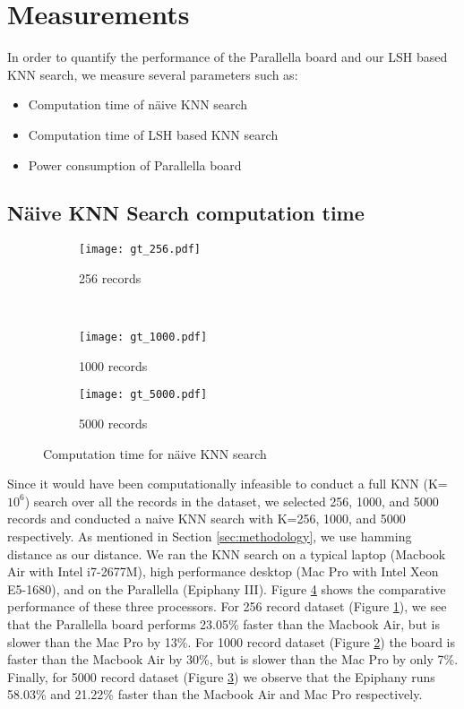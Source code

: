 \section{Measurements}
\label{sec:measurements}
In order to quantify the performance of the Parallella board and our LSH based KNN search, we measure several parameters such as:
\begin{itemize}
\item Computation time of n\"{a}ive KNN search
\item Computation time of LSH based KNN search
\item Power consumption of Parallella board
\end{itemize}
\subsection{N\"{a}ive KNN Search computation time}
\label{subsec:nknn_comptime}
\begin{figure}
\centering
\begin{subfigure}[b]{0.3\textwidth}
	\texttt{[image: gt\_256.pdf]}
	\caption{256 records}
	\label{fig:k256_comptime}
\end{subfigure}
~
\begin{subfigure}[b]{0.3\textwidth}
	\texttt{[image: gt\_1000.pdf]}
	\caption{1000 records}
	\label{fig:k1000_comptime}
\end{subfigure}
\begin{subfigure}[b]{0.3\textwidth}
	\texttt{[image: gt\_5000.pdf]}
	\caption{5000 records}
	\label{fig:k5000_comptime}
\end{subfigure}
\caption{Computation time for n\"{a}ive KNN search}
\label{fig:fullK256_1000_5000}
\end{figure}
Since it would have been computationally infeasible to conduct a full KNN (K=$10^6$) search over all the records in the dataset, we selected 256, 1000, and 5000 records and conducted a naive KNN search with K=256, 1000, and 5000 respectively. 
As mentioned in Section \ref{sec:methodology}, we use hamming distance as our distance. 
We ran the KNN search on a typical laptop (Macbook Air with Intel i7-2677M), high performance desktop (Mac Pro with Intel Xeon E5-1680), and on the Parallella (Epiphany III). 
Figure \ref{fig:fullK256_1000_5000} shows the comparative performance of these three processors. For 256 record dataset (Figure \ref{fig:k256_comptime}), we see that the Parallella board performs 23.05\% faster than the Macbook Air, but is slower than the Mac Pro by 13\%. 
For 1000 record dataset (Figure \ref{fig:k1000_comptime}) the board is faster than the Macbook Air by 30\%, but is slower than the Mac Pro by only 7\%. 
Finally, for 5000 record dataset (Figure \ref{fig:k5000_comptime}) we observe that the Epiphany runs 58.03\% and 21.22\% faster than the Macbook Air and Mac Pro respectively. 

